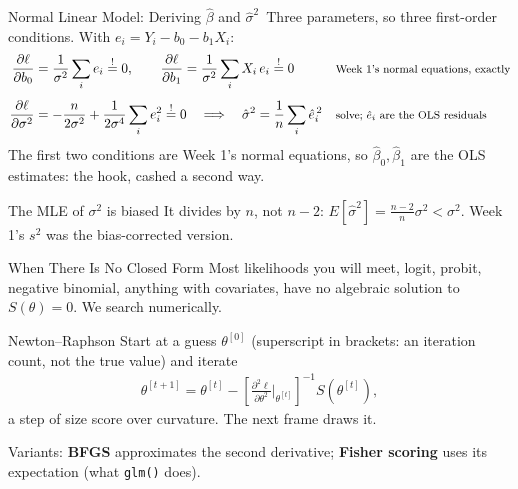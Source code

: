 \documentclass[aspectratio=169,11pt,xcolor=dvipsnames]{beamer}
\newcommand{\E}{E}
\newcommand{\loglik}{\ell}
\newcommand{\core}{\,\raisebox{0.6pt}{\textcolor{corestar}{$\bigstar$}}}
\begin{document}
\begin{frame}{Normal Linear Model: Deriving $\hat\beta$ and $\hat\sigma^2$\core}
Three parameters, so three first-order conditions. With
$e_i = Y_i - b_0 - b_1X_i$:
\begingroup\small
\setlength{\abovedisplayskip}{2pt}\setlength{\belowdisplayskip}{2pt}
\begin{align*}
  \frac{\partial\loglik}{\partial b_0}
  &= \frac{1}{\sigma^2}\sum_i e_i \overset{!}{=} 0,
  \qquad
  \frac{\partial\loglik}{\partial b_1}
  = \frac{1}{\sigma^2}\sum_i X_i\, e_i \overset{!}{=} 0
    && \text{\footnotesize Week 1's normal equations, exactly} \\[4pt]
  \frac{\partial\loglik}{\partial\sigma^2}
  &= -\frac{n}{2\sigma^2} + \frac{1}{2\sigma^4}\sum_i e_i^2 \overset{!}{=} 0
  \quad\Longrightarrow\quad
  \hat\sigma^2 = \frac1n\sum_i \hat e_i^{\,2}
    && \text{\footnotesize solve; $\hat e_i$ are the OLS residuals}
\end{align*}
\endgroup
The first two conditions are Week 1's normal equations, so
$\hat\beta_0, \hat\beta_1$ are the OLS estimates: the hook, cashed a second
way.
\vskip3pt
\begin{alertblock}{The MLE of $\sigma^2$ is biased}
It divides by $n$, not $n-2$: $\E[\hat\sigma^2] = \frac{n-2}{n}\sigma^2 <
\sigma^2$. Week 1's $s^2$ was the bias-corrected version.
\end{alertblock}
\end{frame}

\begin{frame}{When There Is No Closed Form}
Most likelihoods you will meet, logit, probit, negative binomial, anything
with covariates, have no algebraic solution to $S(\theta)=0$. We search
numerically.
\vskip4pt
\begin{block}{Newton--Raphson}
Start at a guess $\theta^{[0]}$ (superscript in brackets: an iteration count, not the true value) and iterate
\begin{align*}
  \theta^{[t+1]} = \theta^{[t]} - \left[\frac{\partial^2\loglik}{\partial\theta^2}
  \bigg|_{\theta^{[t]}}\right]^{-1} S(\theta^{[t]}) ,
\end{align*}
a step of size score over curvature. The next frame draws it.
\end{block}
\vskip3pt
Variants: \textbf{BFGS} approximates the second derivative; \textbf{Fisher
scoring} uses its expectation (what \texttt{glm()} does).
\end{frame}
\end{document}
